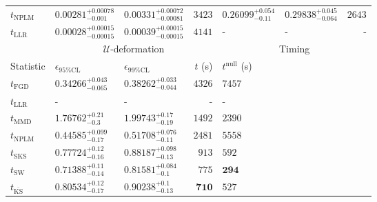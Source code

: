 \begin{tabular}{l|llr|llr}
\rowcolor{red!35}	$t_{\mathrm{NPLM}}$ & $0.00281_{-0.001}^{+0.00078}$ & $0.00331_{-0.00081}^{+0.00072}$ & $3423$ & $0.26099_{-0.11}^{+0.054}$ & $0.29838_{-0.064}^{+0.045}$ & $2643$ \\
	$t_{\mathrm{LLR}}$ & $0.00028_{-0.00015}^{+0.00015}$ & $0.00039_{-0.00015}^{+0.00015}$ & $4141$ & - & - & - \\
	\toprule
	\multicolumn{1}{c}{} & \multicolumn{3}{c}{$\mathcal{U}$-deformation} & \multicolumn{3}{c}{Timing} \\
	Statistic & $\epsilon_{95\%\mathrm{CL}}$ & $\epsilon_{99\%\mathrm{CL}}$ & $t$ (s) & $t^{\mathrm{null}}$ (s) \\
	\midrule
	$t_{\mathrm{FGD}}$ & ${\mathbf{0.34266_{-0.065}^{+0.043}}}$ & ${\mathbf{0.38262_{-0.044}^{+0.033}}}$ & $4326$ & $7457$ \\
	$t_{\mathrm{LLR}}$ & - & - & - & - \\
	$t_{\mathrm{MMD}}$ & $1.76762_{-0.3}^{+0.21}$ & $1.99743_{-0.19}^{+0.17}$ & $1492$ & $2390$ \\
\rowcolor{red!35}	$t_{\mathrm{NPLM}}$ & $0.44585_{-0.17}^{+0.099}$ & $0.51708_{-0.11}^{+0.076}$ & $2481$ & $5558$ \\
	$t_{\mathrm{SKS}}$ & $0.77724_{-0.16}^{+0.12}$ & $0.88187_{-0.13}^{+0.098}$ & $913$ & $592$ \\
	$t_{\mathrm{SW}}$ & $0.71388_{-0.14}^{+0.11}$ & $0.81581_{-0.1}^{+0.084}$ & $775$ & ${\mathbf{294}}$ \\
	$t_{\overline{\mathrm{KS}}}$ & $0.80534_{-0.17}^{+0.12}$ & $0.90238_{-0.13}^{+0.1}$ & ${\mathbf{710}}$ & $527$ \\
	\bottomrule
\end{tabular}
